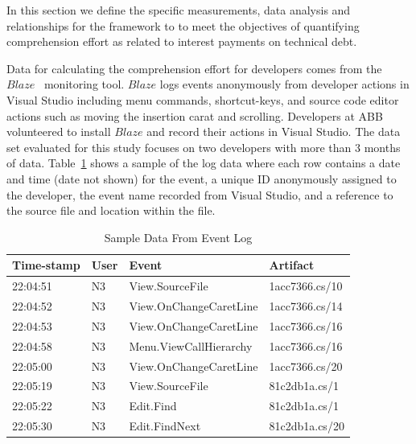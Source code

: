In this section we define the specific measurements, data analysis and relationships for the framework to to meet the objectives of quantifying comprehension effort as related to interest payments on technical debt.

Data for calculating the comprehension effort for developers comes from the $Blaze$~\cite{Snipes_etal:2014} monitoring tool.  $Blaze$ logs events anonymously from developer actions in Visual Studio including menu commands, shortcut-keys, and source code editor actions such as moving the insertion carat and scrolling.  Developers at ABB volunteered to install $Blaze$ and record their actions in Visual Studio.  The data set evaluated for this study focuses on two developers with more than 3 months of data.  Table~\ref{fig:SampleEventData} shows a sample of the log data where each row contains a date and time (date not shown) for the event, a unique ID anonymously assigned to the developer, the event name recorded from Visual Studio, and a reference to the source file and location within the file.

\begin{center}
\begin{table}[!t]
	\caption{Sample Data From Event Log}
	\begin{tabular}{|l|l|l|l|}
	\hline

Time-stamp & User & Event & Artifact \\
\hline\hline
22:04:51 & N3 & View.SourceFile & 1acc7366.cs/10 \\
\hline
22:04:52 & N3 & View.OnChangeCaretLine & 1acc7366.cs/14 \\
\hline
22:04:53 & N3 & View.OnChangeCaretLine & 1acc7366.cs/16 \\
\hline
22:04:58 & N3 & Menu.ViewCallHierarchy & 1acc7366.cs/16 \\
\hline
22:05:00 & N3 & View.OnChangeCaretLine & 1acc7366.cs/20 \\
\hline
22:05:19 & N3 & View.SourceFile & 81c2db1a.cs/1 \\
\hline
22:05:22 & N3 & Edit.Find & 81c2db1a.cs/1 \\
\hline
22:05:30 & N3 & Edit.FindNext & 81c2db1a.cs/20 \\
\hline

	\end{tabular}
	\label{fig:SampleEventData}
\end{table}
\end{center}


